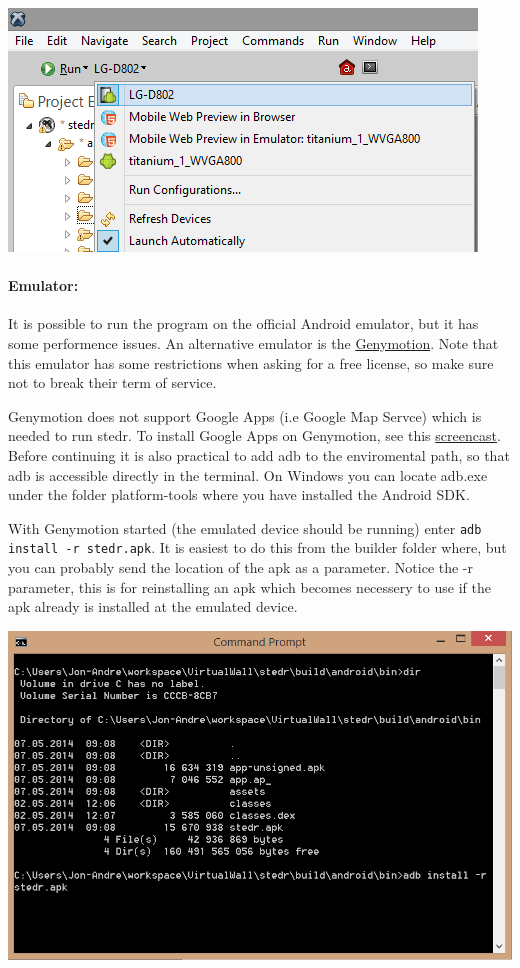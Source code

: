 \begin{center}
\includegraphics[scale=0.45]{guide/f4.png} 
\end{center}

\paragraph{Emulator:}
It is possible to run the program on the official Android emulator, but it has some performence issues. An alternative emulator is the \href{https://shop.genymotion.com/index.php?controller=order-opc}{Genymotion}. Note that this emulator has some restrictions when asking for a free license, so make sure not to break their term of service. 

Genymotion does not support Google Apps (i.e Google Map Servce) which is needed to run stedr. To install Google Apps on Genymotion, see this \href{https://www.youtube.com/watch?v=iCRNqCXGNK0}{screencast}. Before continuing it is also practical to add adb to the enviromental path, so that adb is accessible directly in the terminal. On Windows you can locate adb.exe under the folder platform-tools where you have installed the Android SDK. 

With Genymotion started (the emulated device should be running) enter \texttt{adb install -r stedr.apk}. It is easiest to do this from the builder folder where, but you can probably send the location of the apk as a parameter. Notice the -r parameter, this is for reinstalling an apk which becomes necessery to use if the apk already is installed at the emulated device.

\begin{center}
\includegraphics[scale=0.7]{guide/f45.png} 
\end{center}
\clearpage
